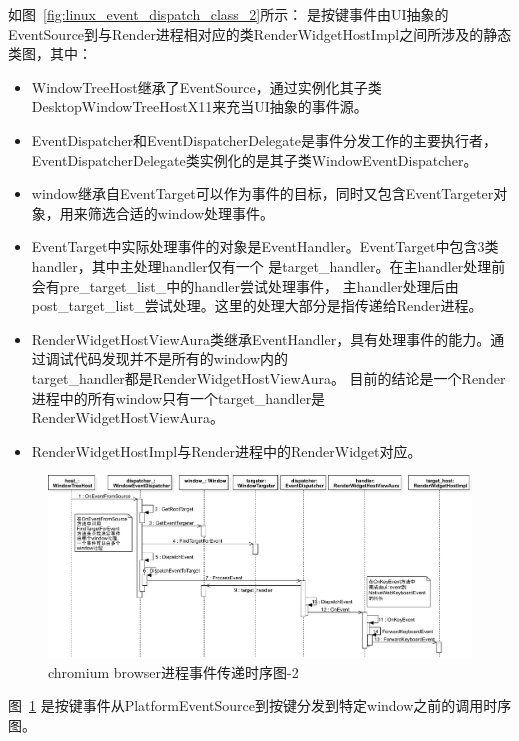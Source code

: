 \documentclass[12pt]{article}
\begin{document}
如图~\ref{fig:linux_event_dispatch_class_2}所示：
是按键事件由UI抽象的EventSource到与Render进程相对应的类RenderWidgetHostImpl之间所涉及的静态类图，其中：
\begin{itemize}
  \item WindowTreeHost继承了EventSource，通过实例化其子类DesktopWindowTreeHostX11来充当UI抽象的事件源。
  \item EventDispatcher和EventDispatcherDelegate是事件分发工作的主要执行者，
  EventDispatcherDelegate类实例化的是其子类WindowEventDispatcher。
  \item window继承自EventTarget可以作为事件的目标，同时又包含EventTargeter对象，用来筛选合适的window处理事件。
  \item EventTarget中实际处理事件的对象是EventHandler。EventTarget中包含3类handler，其中主处理handler仅有一个
  是target\_handler。在主handler处理前会有pre\_target\_list\_中的handler尝试处理事件，
  主handler处理后由post\_target\_list\_尝试处理。这里的处理大部分是指传递给Render进程。
  \item RenderWidgetHostViewAura类继承EventHandler，具有处理事件的能力。通过调试代码发现并不是所有的window内的\\
  target\_handler都是RenderWidgetHostViewAura。
  目前的结论是一个Render进程中的所有window只有一个target\_handler是RenderWidgetHostViewAura。
  \item RenderWidgetHostImpl与Render进程中的RenderWidget对应。
\end{itemize}

\begin{figure}[H] 
  \centering 
  \includegraphics[width=\textwidth]{image/browser_event_dispatch_sequence_2.pdf} 
  \caption{chromium browser进程事件传递时序图-2} \label{fig:browser_event_dispatch_sequence_2} 
\end{figure}

图~\ref{fig:browser_event_dispatch_sequence_2}
是按键事件从PlatformEventSource到按键分发到特定window之前的调用时序图。
\end{document}
